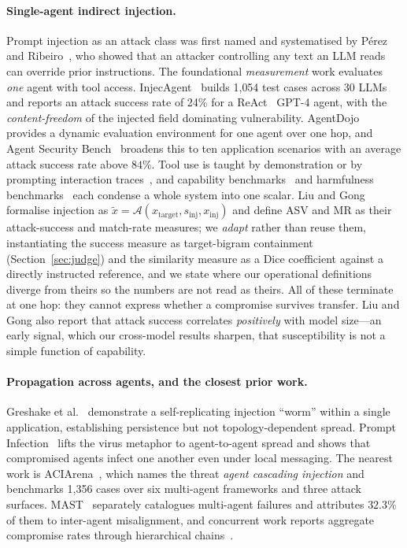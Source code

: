 \documentclass[sigconf,anonymous]{aamas}
\begin{document}
\paragraph{Single-agent indirect injection.}
Prompt injection as an attack class was first named and systematised by
P\'{e}rez and Ribeiro~\cite{Perez2022PromptInjection}, who showed that an
attacker controlling any text an LLM reads can override prior instructions.
The foundational \emph{measurement} work evaluates \emph{one} agent with tool
access. InjecAgent~\cite{Zhan2024InjecAgent} builds 1{,}054 test cases across
30 LLMs and reports an attack success rate of 24\% for a
ReAct~\cite{Yao2023ReAct} GPT-4 agent, with the \emph{content-freedom} of the
injected field dominating vulnerability. AgentDojo~\cite{Debenedetti2024AgentDojo}
provides a dynamic evaluation environment for one agent over one hop, and
Agent Security Bench~\cite{Zhang2025ASB} broadens this to ten application
scenarios with an average attack success rate above $84\%$. Tool use is taught by
demonstration or by prompting interaction traces~\cite{Schick2023Toolformer,Yao2023ReAct},
and capability
benchmarks~\cite{Liu2024AgentBench,Jimenez2024SWEBench} and harmfulness
benchmarks~\cite{Andriushchenko2025AgentHarm} each condense a whole system into one
scalar.
Liu and Gong~\cite{LiuGong2024} formalise injection as
$\tilde{x} = \mathcal{A}(x_{\mathrm{target}}, s_{\mathrm{inj}}, x_{\mathrm{inj}})$
and define ASV and MR as their attack-success and match-rate measures; we
\emph{adapt} rather than reuse them, instantiating the success measure as
target-bigram containment (Section~\ref{sec:judge}) and the similarity measure as a
Dice coefficient against a directly instructed reference, and we state where our
operational definitions diverge from theirs so the numbers are not read as theirs.
All of these terminate at one hop: they
cannot express whether a compromise survives transfer. Liu and Gong also report
that attack success correlates \emph{positively} with model size---an early signal,
which our cross-model results sharpen, that susceptibility is not a simple function
of capability.

\paragraph{Propagation across agents, and the closest prior work.}
Greshake et al.~\cite{Greshake2023} demonstrate a self-replicating injection
``worm'' within a single application, establishing persistence but not
topology-dependent spread. Prompt Infection~\cite{Lee2025Infection} lifts the
virus metaphor to agent-to-agent spread and shows that compromised agents infect
one another even under local messaging. The nearest work is ACIArena~\cite{An2026ACIARena},
which names the threat \emph{agent cascading injection} and benchmarks 1{,}356
cases over six multi-agent frameworks and three attack surfaces. MAST~\cite{Cemri2025MAST}
separately catalogues multi-agent failures and attributes $32.3\%$ of them to
inter-agent misalignment, and concurrent work reports aggregate compromise rates
through hierarchical chains~\cite{CII2026}.
\end{document}
